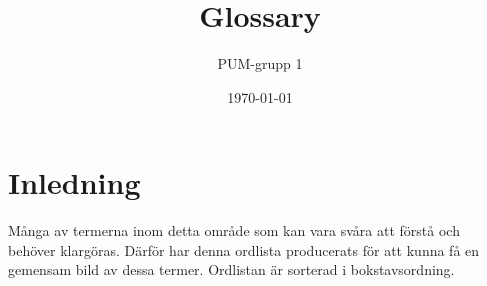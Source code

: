 

\ifpdf
\else
\fi

\title{Glossary}
\author{PUM-grupp 1}
\date{\today}



\maketitle\thispagestyle{empty}

\newpage


\section{Inledning}

Många av termerna inom detta område som kan vara svåra att förstå och behöver klargöras. Därför har denna ordlista producerats för att kunna få en gemensam bild av dessa termer. Ordlistan är sorterad i bokstavsordning.

